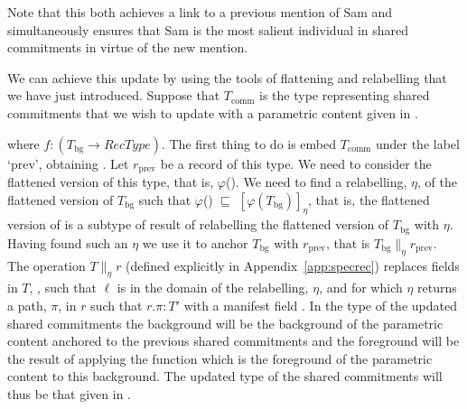 Note that this both achieves a link to a previous mention of Sam and
simultaneously ensures that Sam is the most salient individual in
shared commitments in virtue of the new mention.


We can achieve this update by using the tools of flattening and
relabelling that we have just introduced.  Suppose that $T_{\mathrm{comm}}$ is the
type representing shared commitments that we wish to update with a
parametric content given in \nexteg{}.
\begin{ex}
\end{ex}
where $f:(T_{\mathrm{bg}}\rightarrow\textit{RecType})$.  The
first thing to do is embed  $T_{\mathrm{comm}}$ under the label `prev', obtaining
.  Let
$r_{\mathrm{prev}}$ be a record of this type.  We need to
consider the flattened version of this type, that is,
$\varphi$(). We
need to find a relabelling, $\eta$, of the flattened version of
$T_{\mathrm{bg}}$ such that
$\varphi$()
$\sqsubseteq$ $[\varphi(T_{\mathrm{bg}})]_\eta$, that is, the
flattened version of
 is a subtype of
result of relabelling the flattened version of $T_{\mathrm{bg}}$ with
$\eta$.  Having found such an $\eta$ we use it to anchor
$T_{\mathrm{bg}}$ with $r_{\mathrm{prev}}$, that is
$T_{\mathrm{bg}}\parallel_\eta r_{\mathrm{prev}}$. The operation
$T \parallel_\eta r$ (defined explicitly in
Appendix~\ref{app:specrec}) replaces fields in $T$, , such
that $\ell$ is in the
domain of the relabelling, $\eta$, and for which $\eta$ returns a
path, $\pi$,
in $r$ such that $r.\pi:T'$ with a manifest
field . In the type of the updated shared
commitments the background will be the background of the parametric
content anchored to the previous shared commitments and the foreground
will be the result of applying the function which is the foreground of
the parametric content to this background.
The updated type of the shared commitments
will thus be that given in \nexteg{}.   
\begin{ex} 
\end{ex} 

